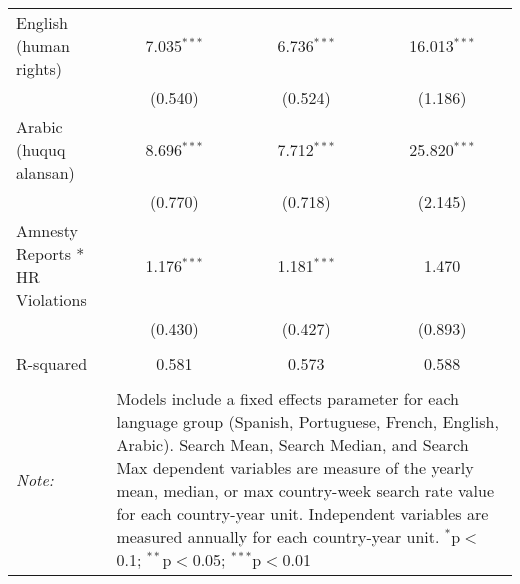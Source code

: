 \begin{table}[!htbp]
\begin{tabular}{@{\extracolsep{5pt}}lccc}
  English (human rights) & 7.035$^{***}$ & 6.736$^{***}$ & 16.013$^{***}$ \\ 
  & (0.540) & (0.524) & (1.186) \\ 
  Arabic (huquq alansan) & 8.696$^{***}$ & 7.712$^{***}$ & 25.820$^{***}$ \\ 
  & (0.770) & (0.718) & (2.145) \\ 
  Amnesty Reports * HR Violations & 1.176$^{***}$ & 1.181$^{***}$ & 1.470 \\ 
  & (0.430) & (0.427) & (0.893) \\ 
 \hline \\[-1.8ex] 
R-squared  & 0.581 & 0.573 & 0.588 \\ 
\hline 
\hline \\[-1.8ex] 
\textit{Note:}  & \multicolumn{3}{l}{\parbox[t]{8cm}{Models include a fixed effects parameter for each language group (Spanish, Portuguese, French, English, Arabic). Search Mean, Search Median, and Search Max dependent variables are measure of the yearly mean, median, or max country-week search rate value for each country-year unit. Independent variables are measured annually for each country-year unit. $^{*}$p$<$0.1; $^{**}$p$<$0.05; $^{***}$p$<$0.01}} \\ 
\end{tabular} 
\end{table} 
